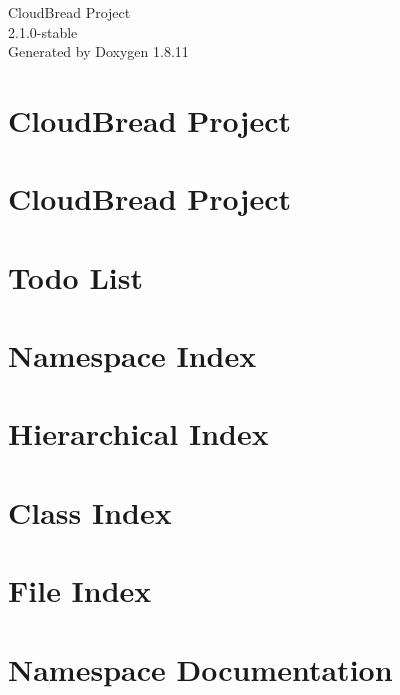 \documentclass[twoside]{book}
\newcommand{\+}{\discretionary{\mbox{\scriptsize$\hookleftarrow$}}{}{}}
\newcommand{\clearemptydoublepage}{%
  \newpage{\pagestyle{empty}\cleardoublepage}%
}
\begin{document}
\hypersetup{pageanchor=false,
             bookmarksnumbered=true,
             pdfencoding=unicode
            }
\begin{titlepage}
\vspace*{7cm}
\begin{center}%
{\Large Cloud\+Bread Project \\[1ex]\large 2.\+1.\+0-\/stable }\\
\vspace*{1cm}
{\large Generated by Doxygen 1.8.11}\\
\end{center}
\end{titlepage}
\clearemptydoublepage
\tableofcontents
\clearemptydoublepage
{}
\hypersetup{pageanchor=true}

\chapter{Cloud\+Bread Project}
\label{index}\hypertarget{index}{}
\chapter{Cloud\+Bread Project}
\label{a00002}
\hypertarget{a00002}{}

\chapter{Todo List}
\label{a00001}
\hypertarget{a00001}{}

\chapter{Namespace Index}

\chapter{Hierarchical Index}

\chapter{Class Index}

\chapter{File Index}

\chapter{Namespace Documentation}









\end{document}
